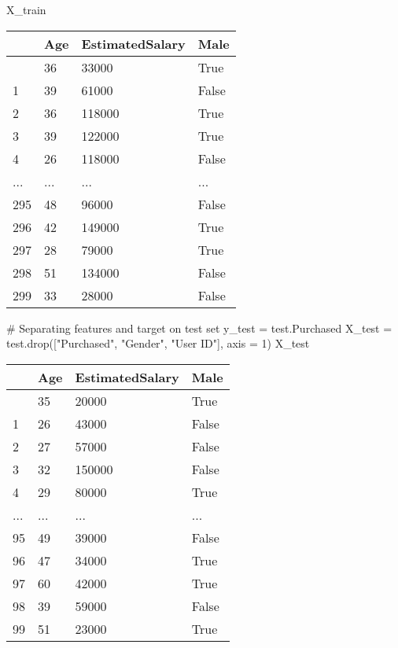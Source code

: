 \documentclass[
  letterpaper,
  DIV=11,
  numbers=noendperiod]{scrreprt}
\newenvironment{Shaded}{\begin{snugshade}}{\end{snugshade}}
\newcommand{\CommentTok}[1]{\textcolor[rgb]{0.37,0.37,0.37}{#1}}
\newcommand{\DecValTok}[1]{\textcolor[rgb]{0.68,0.00,0.00}{#1}}
\newcommand{\NormalTok}[1]{\textcolor[rgb]{0.00,0.23,0.31}{#1}}
\newcommand{\OperatorTok}[1]{\textcolor[rgb]{0.37,0.37,0.37}{#1}}
\newcommand{\StringTok}[1]{\textcolor[rgb]{0.13,0.47,0.30}{#1}}
\begin{document}
\begin{Shaded}
\begin{Highlighting}[]
\NormalTok{X\_train}
\end{Highlighting}
\end{Shaded}

\begin{longtable}[]{@{}llll@{}}
\toprule\noalign{}
& Age & EstimatedSalary & Male \\
\midrule\noalign{}
\endhead
\bottomrule\noalign{}
\endlastfoot
0 & 36 & 33000 & True \\
1 & 39 & 61000 & False \\
2 & 36 & 118000 & True \\
3 & 39 & 122000 & True \\
4 & 26 & 118000 & False \\
... & ... & ... & ... \\
295 & 48 & 96000 & False \\
296 & 42 & 149000 & True \\
297 & 28 & 79000 & True \\
298 & 51 & 134000 & False \\
299 & 33 & 28000 & False \\
\end{longtable}

\begin{Shaded}
\begin{Highlighting}[]
\CommentTok{\# Separating features and target on test set}
\NormalTok{y\_test }\OperatorTok{=}\NormalTok{ test.Purchased}
\NormalTok{X\_test }\OperatorTok{=}\NormalTok{ test.drop([}\StringTok{"Purchased"}\NormalTok{, }\StringTok{"Gender"}\NormalTok{, }\StringTok{"User ID"}\NormalTok{], axis }\OperatorTok{=} \DecValTok{1}\NormalTok{)}
\NormalTok{X\_test}
\end{Highlighting}
\end{Shaded}

\begin{longtable}[]{@{}llll@{}}
\toprule\noalign{}
& Age & EstimatedSalary & Male \\
\midrule\noalign{}
\endhead
\bottomrule\noalign{}
\endlastfoot
0 & 35 & 20000 & True \\
1 & 26 & 43000 & False \\
2 & 27 & 57000 & False \\
3 & 32 & 150000 & False \\
4 & 29 & 80000 & True \\
... & ... & ... & ... \\
95 & 49 & 39000 & False \\
96 & 47 & 34000 & True \\
97 & 60 & 42000 & True \\
98 & 39 & 59000 & False \\
99 & 51 & 23000 & True \\
\end{longtable}
\end{document}
